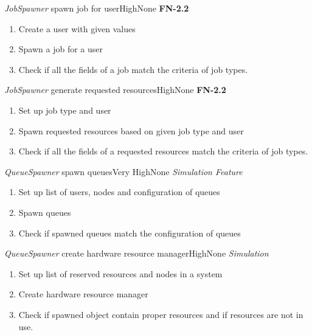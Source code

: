 \begin{testcase}{\emph{JobSpawner} spawn job for user}{High}{None}
	{
		\textbf{FN-2.2}
	}
	{
		\begin{enumerate}
			\item Create a user with given values
			\item Spawn a job for a user
			\item Check if all the fields of a job match the criteria of job types.
		\end{enumerate}
	}
\end{testcase}

\begin{testcase}{\emph{JobSpawner} generate requested resources}{High}{None}
	{
		\textbf{FN-2.2}
	}
	{
		\begin{enumerate}
			\item Set up job type and user
			\item Spawn requested resources based on given job type and user
			\item Check if all the fields of a requested resources match the criteria of job types.
		\end{enumerate}
	}
\end{testcase}

\begin{testcase}{\emph{QueueSpawner} spawn queues}{Very High}{None}
	{
		\emph{Simulation Feature}
	}
	{
		\begin{enumerate}
			\item Set up list of users, nodes and configuration of queues
			\item Spawn queues
			\item Check if spawned queues match the configuration of queues
		\end{enumerate}
	}
\end{testcase}

\begin{testcase}{\emph{QueueSpawner} create hardware resource manager}{High}{None}
	{
		\emph{Simulation}
	}
	{
		\begin{enumerate}
			\item Set up list of reserved resources and nodes in a system
			\item Create hardware resource manager
			\item Check if spawned object contain proper resources and if resources are not in use.
		\end{enumerate}
	}
\end{testcase}

